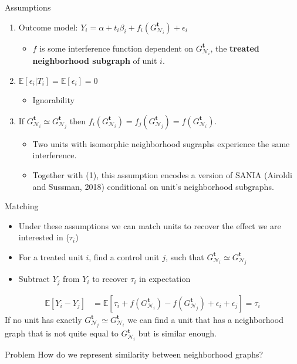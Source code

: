 \documentclass[newPxFont,numfooter,sectionpages]{beamer}
\newcommand{\E}{\mathbb{E}}
\newcommand{\bt}{\mathbf{t}}
\newcommand{\Gnit}{G_{\mathcal{N}_i}^\bt}
\newcommand{\Gnjt}{G_{\mathcal{N}_j}^\bt}
\begin{document}
\begin{frame}{Assumptions}
\begin{enumerate}
  \item Outcome model: $Y_i = \alpha + t_i\beta_i + f_i(\Gnit) + \epsilon_i$
  \begin{itemize}
    \item $f$ is some interference function dependent on $\Gnit$, the \textbf{treated neighborhood subgraph} of unit $i$.
  \end{itemize}
  \item $\E[\epsilon_i|T_i] = \E[\epsilon_i] = 0$
    \begin{itemize}
    \item Ignorability
  \end{itemize}
  \item If $\Gnit \simeq \Gnjt$ then $f_i(\Gnit) = f_j(\Gnjt) = f(\Gnit)$.   \begin{itemize}
    \item Two units with isomorphic neighborhood sugraphs experience the same interference.
    \item Together with (1), this assumption encodes a version of SANIA (Airoldi and Sussman, 2018) conditional on unit's neighborhood subgraphs.
  \end{itemize}
\end{enumerate}
\end{frame}
\begin{frame}{Matching}
\begin{itemize}
  \item Under these assumptions we can match units to recover the effect we are interested in ($\tau_i$)
  \item For a treated unit $i$, find a control unit $j$, such that $\Gnit \simeq \Gnjt$
  \item Subtract $Y_j$ from $Y_i$ to recover $\tau_i$ in expectation
\end{itemize}
\begin{align*}
\E[Y_i - Y_j] &= \E[\tau_i + f(\Gnit) - f(\Gnjt) + \epsilon_i + \epsilon_j] = \tau_i
\end{align*}
If no unit has exactly $\Gnjt \simeq \Gnit$ we can find a unit that has a neighborhood graph that is not quite equal to $\Gnit$ but is similar enough.
\begin{alertblock}{Problem}
How do we represent similarity between neighborhood graphs?
\end{alertblock}
\end{frame}
\end{document}
